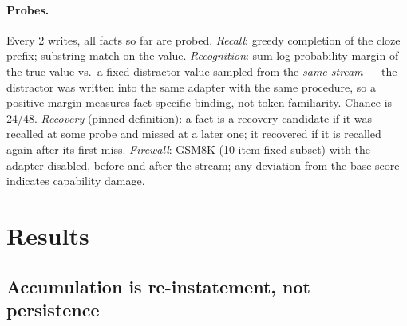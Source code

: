 \documentclass[11pt]{article}
\begin{document}
\paragraph{Probes.} Every 2 writes, all facts so far are probed. \emph{Recall}: greedy completion of
the cloze prefix; substring match on the value. \emph{Recognition}: sum log-probability margin of the
true value vs.\ a fixed distractor value sampled from the \emph{same stream} --- the distractor was
written into the same adapter with the same procedure, so a positive margin measures fact-specific
binding, not token familiarity. Chance is 24/48. \emph{Recovery} (pinned definition): a fact is a
recovery candidate if it was recalled at some probe and missed at a later one; it recovered if it is
recalled again after its first miss. \emph{Firewall}: GSM8K (10-item fixed subset) with the adapter
disabled, before and after the stream; any deviation from the base score indicates capability damage.

\section{Results}

\subsection{Accumulation is re-instatement, not persistence}\label{sec:reinstatement}
\end{document}
